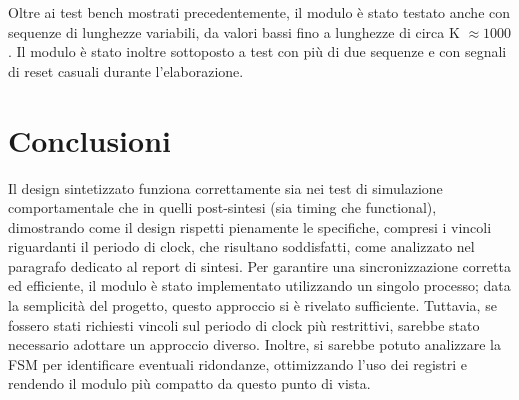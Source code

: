 \documentclass[11pt,a4paper]{article}
\newcommand{\m}[1]{{\scriptsize\fontfamily{fvm}\selectfont #1}}
\begin{document}
Oltre ai test bench mostrati precedentemente, il modulo è stato testato anche con sequenze di lunghezze variabili, da valori bassi fino a lunghezze di circa \m{K} $\approx 1000$. Il modulo è stato inoltre sottoposto a test con più di due sequenze e con segnali di reset casuali durante l'elaborazione.

\section{Conclusioni}

Il design sintetizzato funziona correttamente sia nei test di simulazione comportamentale che in quelli post-sintesi (sia timing che functional), dimostrando come il design rispetti pienamente le specifiche, compresi i vincoli riguardanti il periodo di clock, che risultano soddisfatti, come analizzato nel paragrafo dedicato al report di sintesi. Per garantire una sincronizzazione corretta ed efficiente, il modulo è stato implementato utilizzando un singolo processo; data la semplicità del progetto, questo approccio si è rivelato sufficiente. Tuttavia, se fossero stati richiesti vincoli sul periodo di clock più restrittivi, sarebbe stato necessario adottare un approccio diverso. Inoltre, si sarebbe potuto analizzare la FSM per identificare eventuali ridondanze, ottimizzando l'uso dei registri e rendendo il modulo più compatto da questo punto di vista.
\end{document}
